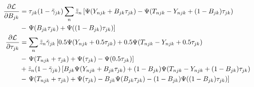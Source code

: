 \documentclass[reqno]{amsart}
\numberwithin{equation}{section}
\begin{document}
\begin{align}
    \frac{\partial \mathcal{L}}{\partial B_{jk}}
        &= \tau_{jk} (1-\tilde{\gamma}_{jk}) \sum_n \tilde{z}_n \left[ \Psi(Y_{njk}+B_{jk}\tau_{jk})
        - \Psi(T_{njk}-Y_{njk}+(1-B_{jk})\tau_{jk}) \right. \notag\\
        &- \left. \Psi(B_{jk}\tau_{jk}) + \Psi((1-B_{jk})\tau_{jk}) \right] \\
    \frac{\partial \mathcal{L}}{\partial \tau_{jk}}
        &= \sum_n \tilde{z}_n \tilde{\gamma}_{jk} \left[ 0.5 \Psi(Y_{njk}+0.5\tau_{jk}) + 0.5 \Psi(T_{njk}-Y_{njk}+0.5\tau_{jk}) \right. \notag\\
        &- \left. \Psi(T_{njk}+\tau_{jk}) + \Psi(\tau_{jk}) - \Psi(0.5\tau_{jk}) \right] \notag\\
        &+ \tilde{z}_n (1-\tilde{\gamma}_{jk}) \left[ B_{jk} \Psi(Y_{njk}+B_{jk}\tau_{jk})
        + (1-B_{jk}) \Psi(T_{njk}-Y_{njk}+(1-B_{jk})\tau_{jk}) \right. \notag\\
        &- \left. \Psi(T_{njk}+\tau_{jk}) + \Psi(\tau_{jk})
        - B_{jk} \Psi(B_{jk}\tau_{jk}) - (1-B_{jk}) \Psi((1-B_{jk})\tau_{jk}) \right]
\end{align}
\end{document}
